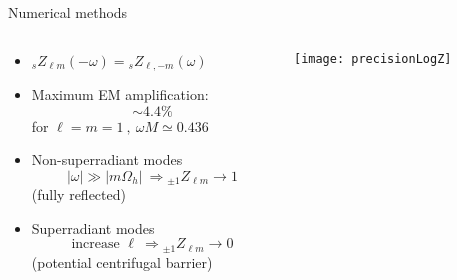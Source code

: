 \documentclass[9pt]{beamer}
\newcommand{\uu}[3][]{ {}_{#1} #2_{#3} }
\begin{document}
\begin{frame}{Numerical methods}
	\begin{columns}
		\begin{column}{0.45\textwidth}
			\begin{itemize}
				\setlength\itemsep{1.5em}
				\item $\uu[s]{Z}{\ell m}(-\omega) = \uu[s]{Z}{\ell, -m}(\omega)$

				\item Maximum EM amplification:
				$$\sim \mathbf{4.4\%}$$
				for $\ell=m=1 ~,~  \omega M \simeq 0.436$

				\item Non-superradiant modes $$|\omega|\gg|m\Omega_h| ~\Rightarrow {}_{\pm 1}{Z}_{\ell m} \to 1 $$ (fully reflected)

				\item Superradiant modes
				$$ \text{increase } \ell ~\Rightarrow {}_{\pm 1}{Z}_{\ell m} \to 0 $$
				(potential centrifugal barrier)
			\end{itemize}
			\vfill
		\end{column}
		\begin{column}{0.55\textwidth}
			\texttt{[image: precisionLogZ]}
		\end{column}
	\end{columns}
\end{frame}
\end{document}

